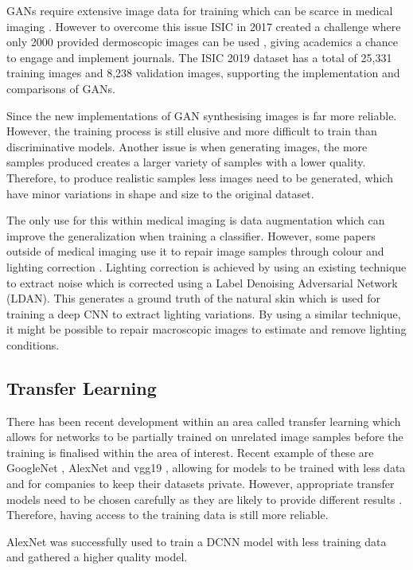 \documentclass[12pt]{report}
\begin{document}
GANs require extensive image data for training which can be scarce in medical imaging \cite{Baur2018}. However to overcome this issue ISIC in 2017 created a challenge where only 2000 provided dermoscopic images can be used \cite{Codella2018}, giving academics a chance to engage and implement journals. The ISIC 2019 dataset has a total of 25,331 training images and 8,238 validation images, supporting the implementation and comparisons of GANs. 

Since the new implementations of GAN synthesising images is far more reliable. However, the training process is still elusive and more difficult to train than discriminative models. Another issue is when generating images, the more samples produced creates a larger variety of samples with a lower quality. Therefore, to produce realistic samples less images need to be generated, which have minor variations in shape and size to the original dataset.

The only use for this within medical imaging is data augmentation which can improve the generalization when training a classifier. However, some papers outside of medical imaging use it to repair image samples through colour \cite{Li2018} and lighting correction \cite{Zhou2018}. Lighting correction is achieved by using an existing technique to extract noise which is corrected using a Label Denoising Adversarial Network (LDAN). This generates a ground truth of the natural skin which is used for training a deep CNN to extract lighting variations. By using a similar technique, it might be possible to repair macroscopic images to estimate and remove lighting conditions.

\subsection{Transfer Learning}
There has been recent development within an area called transfer learning which allows for networks to be partially trained on unrelated image samples before the training is finalised within the area of interest. Recent example of these are GoogleNet \cite{Szegedy2015}, AlexNet \cite{Krizhevsky2012} and vgg19 \cite{Simonyan2015}, allowing for models to be trained with less data and for companies to keep their datasets private. However, appropriate transfer models need to be chosen carefully as they are likely to provide different results \cite{Zhuang2019a}. Therefore, having access to the training data is still more reliable.

AlexNet was successfully used to train a DCNN model with less training data \cite{Hosny2019} and gathered a higher quality model.
\end{document}
